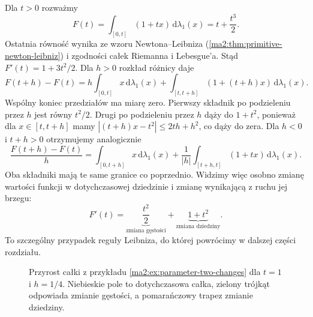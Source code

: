 \begin{przyklad}
\label{ma2:ex:parameter-two-changes}
Dla $t>0$ rozważmy
\[
 F(t)=\int_{[0,t]}(1+tx)\,\mathrm d\lambda_1(x)
      =t+\frac{t^3}{2}.
\]
Ostatnia równość wynika ze wzoru
Newtona--Leibniza
(\ref{ma2:thm:primitive-newton-leibniz})
i zgodności całek Riemanna i Lebesgue'a.
Stąd $F'(t)=1+3t^2/2$.
Dla $h>0$ rozkład różnicy daje
\[
 F(t+h)-F(t)
 =h\int_{[0,t]}x\,\mathrm d\lambda_1(x)
 +\int_{[t,t+h]}(1+(t+h)x)\,\mathrm d\lambda_1(x).
\]
Wspólny koniec przedziałów ma miarę zero.
Pierwszy składnik po podzieleniu przez $h$
jest równy $t^2/2$. Drugi po podzieleniu
przez $h$ dąży do $1+t^2$, ponieważ
dla $x\in[t,t+h]$ mamy
$|(t+h)x-t^2|\le 2th+h^2$, co dąży do zera.
Dla $h<0$ i $t+h>0$ otrzymujemy
analogicznie
\[
 \frac{F(t+h)-F(t)}h
 =\int_{[0,t+h]}x\,\mathrm d\lambda_1(x)
 +\frac1{|h|}\int_{[t+h,t]}(1+tx)\,
                                    \mathrm d\lambda_1(x).
\]
Oba składniki mają te same granice
co poprzednio. Widzimy więc osobno
zmianę wartości funkcji w dotychczasowej
dziedzinie i zmianę wynikającą z ruchu
jej brzegu:
\[
 F'(t)=\underbrace{\frac{t^2}{2}}_{\text{zmiana gęstości}}
       +\underbrace{1+t^2}_{\text{zmiana dziedziny}}.
\]
To szczególny przypadek reguły Leibniza,
do której powrócimy w dalszej części rozdziału.
\end{przyklad}

\begin{figure}[htbp]
\centering
{}
\caption{Przyrost całki z przykładu
\ref{ma2:ex:parameter-two-changes} dla $t=1$
i $h=1/4$. Niebieskie pole to dotychczasowa
całka, zielony trójkąt odpowiada zmianie
gęstości, a pomarańczowy trapez zmianie
dziedziny.}
\label{ma2:fig:parameter-two-changes}
\end{figure}

